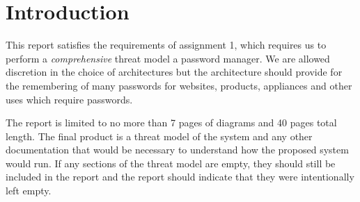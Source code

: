 \chapter*{Introduction}

This report satisfies the requirements of assignment
1\cite{2017myersa1handout}, which requires us to perform a
\textit{comprehensive} threat model a password manager.  We are
allowed discretion in the choice of architectures but the architecture
should provide for the remembering of many passwords for websites,
products, appliances and other uses which require passwords.
\par The report is limited to no more than 7 pages of diagrams and 40
pages total length.  The final product is a threat model of the system
and any other documentation that would be necessary to understand how
the proposed system would run.  If any sections of the threat model
are empty, they should still be included in the report and the report
should indicate that they were intentionally left empty.

\mainmatter
